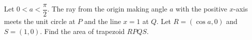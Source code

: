Let $0<a<\dfrac{\pi}{2}$. The ray from the origin making angle $a$ with the positive $x$-axis meets the unit circle at $P$ and the line $x=1$ at $Q$. Let $R=(\cos a,0)$ and $S=(1,0)$. Find the area of trapezoid $RPQS$.
